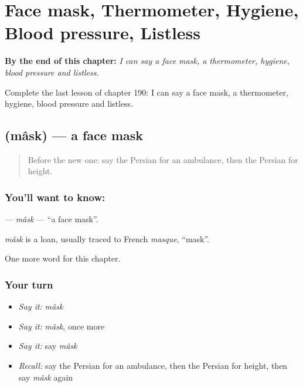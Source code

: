 
\chapter{Face mask, Thermometer, Hygiene, Blood pressure, Listless}
\label{ch:fa-face-mask-thermometer-hygiene-blood-pressure-listless}

\begin{chapteropening}
\textbf{By the end of this chapter:} \emph{I can say a face mask, a thermometer, hygiene, blood pressure and listless.}

Complete the last lesson of chapter 190: I can say a face mask, a thermometer, hygiene, blood pressure and listless.
\end{chapteropening}

\section[\texorpdfstring{\fa{ماسک} (mâsk)}{ماسک (mâsk)}]{ (mâsk) — a face mask}

\label{lesson:FA-C190-mask}



\begin{quote}
Before the new one: say the Persian for an ambulance, then the Persian for height.
\end{quote}

\subsection*{You'll want to know: }
\textbf{} — \emph{mâsk} — \textquotedblleft{}a face mask\textquotedblright{}.

\begin{cousinweb}
\emph{mâsk} is a loan, usually traced to French \emph{masque}, \textquotedblleft{}mask\textquotedblright{}.
\end{cousinweb}

\begin{grammarlens}[title={What you've built}]
One more word for this chapter.
\end{grammarlens}

\subsection*{Your turn}
\begin{itemize}
\raggedright
  \item \emph{Say it:} \emph{mâsk}
  \item \emph{Say it:} \emph{mâsk}, once more
  \item \emph{Say it:} say \emph{mâsk}
  \item \emph{Recall:} say the Persian for an ambulance, then the Persian for height, then say \emph{mâsk} again
\end{itemize}

